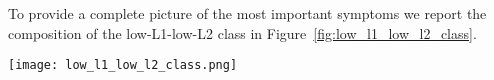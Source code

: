 \noindent
To provide a complete picture of the most important symptoms we report the composition of the low-L1-low-L2 class
in Figure~\ref{fig:low_l1_low_l2_class}.\\

\begin{figure*}[!t]
    \centering
    \texttt{[image: low\_l1\_low\_l2\_class.png]}
    \caption{Composition of the low-L1-low-L2 class for symptoms}
    \label{fig:low_l1_low_l2_class}
\end{figure*}






